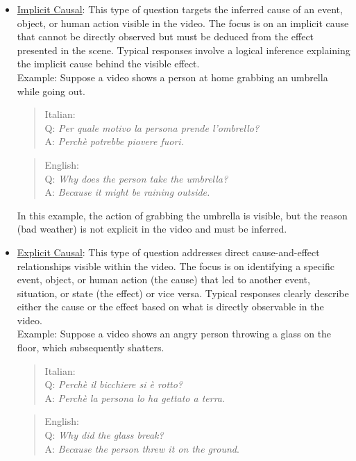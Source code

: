 \begin{itemize}
    \item \underline{Implicit Causal}: This type of question targets the inferred cause of an event, object, or human action visible in the video. The focus is on an implicit cause that cannot be directly observed but must be deduced from the effect presented in the scene. Typical responses involve a logical inference explaining the implicit cause behind the visible effect.\\
    Example: Suppose a video shows a person at home grabbing an umbrella while going out.\\
    
    \begin{quote}
        Italian:\\
Q: \textit{Per quale motivo la persona prende l'ombrello?}\\
A: \textit{Perchè potrebbe piovere fuori.}\\

    \end{quote}
    
    \begin{quote}
        English: \\
Q: \textit{Why does the person take the umbrella?}\\
A: \textit{Because it might be raining outside.}\\

    \end{quote}
In this example, the action of grabbing the umbrella is visible, but the reason (bad weather) is not explicit in the video and must be inferred.

    \item \underline{Explicit Causal}: This type of question addresses direct cause-and-effect relationships visible within the video. The focus is on identifying a specific event, object, or human action (the cause) that led to another event, situation, or state (the effect) or vice versa. Typical responses clearly describe either the cause or the effect based on what is directly observable in the video.\\
    Example: Suppose a video shows an angry person throwing a glass on the floor, which subsequently shatters.\\
    
    \begin{quote}
       Italian:\\
Q: \textit{Perchè il bicchiere si è rotto?}\\
A: \textit{Perchè la persona lo ha gettato a terra}.\\
    \end{quote}
    \begin{quote}
        English:\\
Q: \textit{Why did the glass break?}\\
A: \textit{Because the person threw it on the ground}.\\


\end{quote}
\end{itemize}
